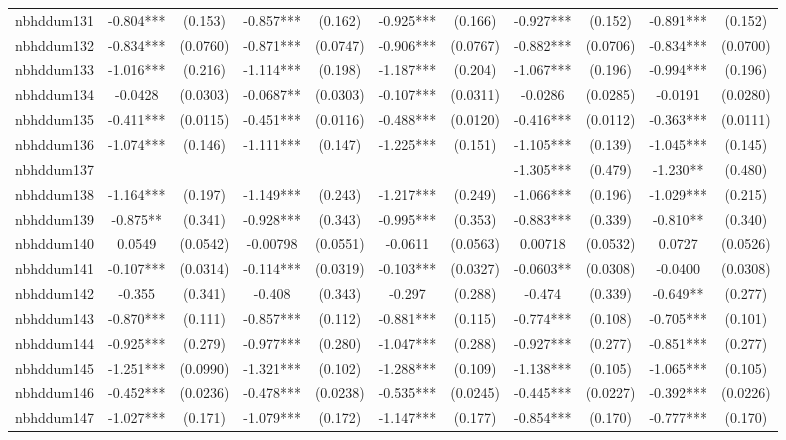 \documentclass[]{article}
\begin{document}
\begin{tabular}{lcccccccccc}
nbhddum131 & -0.804*** & (0.153) & -0.857*** & (0.162) & -0.925*** & (0.166) & -0.927*** & (0.152) & -0.891*** & (0.152) \\
nbhddum132 & -0.834*** & (0.0760) & -0.871*** & (0.0747) & -0.906*** & (0.0767) & -0.882*** & (0.0706) & -0.834*** & (0.0700) \\
nbhddum133 & -1.016*** & (0.216) & -1.114*** & (0.198) & -1.187*** & (0.204) & -1.067*** & (0.196) & -0.994*** & (0.196) \\
nbhddum134 & -0.0428 & (0.0303) & -0.0687** & (0.0303) & -0.107*** & (0.0311) & -0.0286 & (0.0285) & -0.0191 & (0.0280) \\
nbhddum135 & -0.411*** & (0.0115) & -0.451*** & (0.0116) & -0.488*** & (0.0120) & -0.416*** & (0.0112) & -0.363*** & (0.0111) \\
nbhddum136 & -1.074*** & (0.146) & -1.111*** & (0.147) & -1.225*** & (0.151) & -1.105*** & (0.139) & -1.045*** & (0.145) \\
nbhddum137 &  &  &  &  &  &  & -1.305*** & (0.479) & -1.230** & (0.480) \\
nbhddum138 & -1.164*** & (0.197) & -1.149*** & (0.243) & -1.217*** & (0.249) & -1.066*** & (0.196) & -1.029*** & (0.215) \\
nbhddum139 & -0.875** & (0.341) & -0.928*** & (0.343) & -0.995*** & (0.353) & -0.883*** & (0.339) & -0.810** & (0.340) \\
nbhddum140 & 0.0549 & (0.0542) & -0.00798 & (0.0551) & -0.0611 & (0.0563) & 0.00718 & (0.0532) & 0.0727 & (0.0526) \\
nbhddum141 & -0.107*** & (0.0314) & -0.114*** & (0.0319) & -0.103*** & (0.0327) & -0.0603** & (0.0308) & -0.0400 & (0.0308) \\
nbhddum142 & -0.355 & (0.341) & -0.408 & (0.343) & -0.297 & (0.288) & -0.474 & (0.339) & -0.649** & (0.277) \\
nbhddum143 & -0.870*** & (0.111) & -0.857*** & (0.112) & -0.881*** & (0.115) & -0.774*** & (0.108) & -0.705*** & (0.101) \\
nbhddum144 & -0.925*** & (0.279) & -0.977*** & (0.280) & -1.047*** & (0.288) & -0.927*** & (0.277) & -0.851*** & (0.277) \\
nbhddum145 & -1.251*** & (0.0990) & -1.321*** & (0.102) & -1.288*** & (0.109) & -1.138*** & (0.105) & -1.065*** & (0.105) \\
nbhddum146 & -0.452*** & (0.0236) & -0.478*** & (0.0238) & -0.535*** & (0.0245) & -0.445*** & (0.0227) & -0.392*** & (0.0226) \\
nbhddum147 & -1.027*** & (0.171) & -1.079*** & (0.172) & -1.147*** & (0.177) & -0.854*** & (0.170) & -0.777*** & (0.170) \\

\end{tabular}
\end{document}
